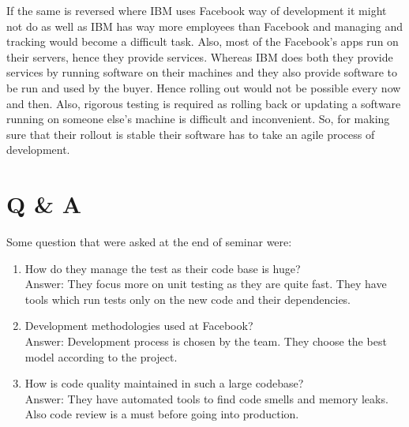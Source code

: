 If the same is reversed where IBM uses Facebook way of development it might not do as well as IBM has way more employees than Facebook and managing and tracking would become a difficult task. Also, most of the Facebook's apps run on their servers, hence they provide services. Whereas IBM does both they provide services by running software on their machines and they also provide software to be run and used by the buyer. Hence rolling out would not be possible every now and then. Also, rigorous testing is required as rolling back or updating a software running on someone else's machine is difficult and inconvenient. So, for making sure that their rollout is stable their software has to take an agile process of development.

\section{Q \& A}

Some question that were asked at the end of seminar were:

\begin{enumerate}
    \item How do they manage the test as their code base is huge? \\
          Answer: They focus more on unit testing as they are quite fast. They have tools which run tests only on the new code and their dependencies.
    \item Development methodologies used at Facebook? \\
          Answer: Development process is chosen by the team. They choose the best model according to the project.
    \item How is code quality maintained in such a large codebase? \\
          Answer:  They have automated tools to find code smells and memory leaks. Also code review is a must before going into production.
\end{enumerate}

